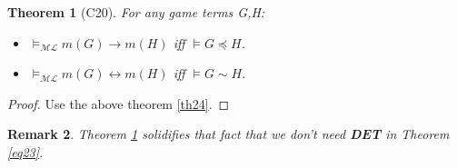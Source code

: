 \documentclass[10pt]{article}
\newcommand{\ml}{\mathcal{ML}}
\newcommand{\cle}{\preccurlyeq}
\newtheorem{theorem}{Theorem}
\newtheorem{remark}[theorem]{Remark}
\begin{document}
		\begin{theorem}[C20]\label{th26}
			For any game terms G,H:
			\begin{itemize}
				\item $\models_{\ml} m(G) \rightarrow m(H)$ iff $\models G \cle H$.
				\item $\models_{\ml} m(G) \leftrightarrow m(H)$ iff $\models G \sim H$.
			\end{itemize}
		\end{theorem}
		\begin{proof}
			Use the above theorem \ref{th24}. 
		\end{proof}
			\begin{remark}
				Theorem \ref{th26} solidifies that fact that we don't need \textbf{DET} in Theorem \ref{eq23}.
			\end{remark}
		
\end{document}
